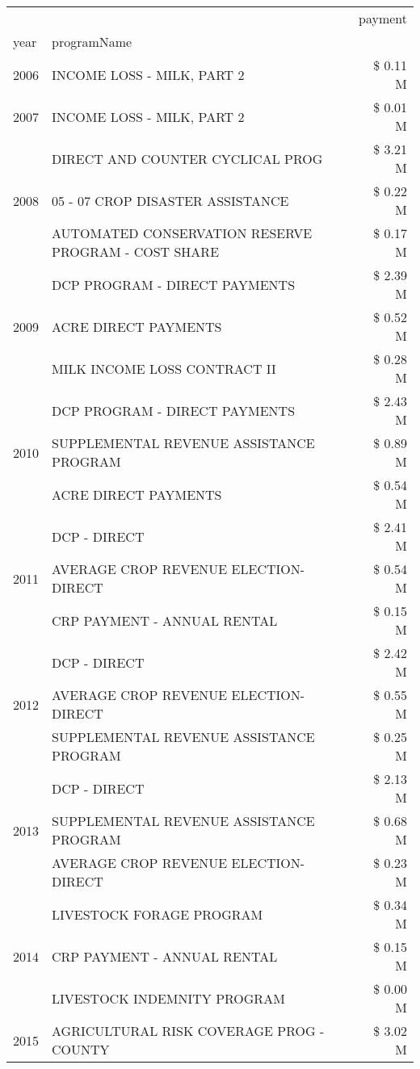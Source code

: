 \begin{tabular}{llr}
\toprule
 &  & payment \\
year & programName &  \\
\midrule
2006 & INCOME LOSS - MILK, PART 2 & \$ 0.11 M \\
\cline{1-3}
2007 & INCOME LOSS - MILK, PART 2 & \$ 0.01 M \\
\cline{1-3}
\multirow[t]{3}{*}{2008} & DIRECT AND COUNTER CYCLICAL PROG & \$ 3.21 M \\
 & 05 - 07 CROP DISASTER ASSISTANCE & \$ 0.22 M \\
 & AUTOMATED CONSERVATION RESERVE PROGRAM - COST SHARE & \$ 0.17 M \\
\cline{1-3}
\multirow[t]{3}{*}{2009} & DCP PROGRAM - DIRECT PAYMENTS & \$ 2.39 M \\
 & ACRE DIRECT PAYMENTS & \$ 0.52 M \\
 & MILK INCOME LOSS CONTRACT II & \$ 0.28 M \\
\cline{1-3}
\multirow[t]{3}{*}{2010} & DCP PROGRAM - DIRECT PAYMENTS & \$ 2.43 M \\
 & SUPPLEMENTAL REVENUE ASSISTANCE PROGRAM & \$ 0.89 M \\
 & ACRE DIRECT PAYMENTS & \$ 0.54 M \\
\cline{1-3}
\multirow[t]{3}{*}{2011} & DCP - DIRECT & \$ 2.41 M \\
 & AVERAGE CROP REVENUE ELECTION-DIRECT & \$ 0.54 M \\
 & CRP PAYMENT - ANNUAL RENTAL & \$ 0.15 M \\
\cline{1-3}
\multirow[t]{3}{*}{2012} & DCP - DIRECT & \$ 2.42 M \\
 & AVERAGE CROP REVENUE ELECTION-DIRECT & \$ 0.55 M \\
 & SUPPLEMENTAL REVENUE ASSISTANCE PROGRAM & \$ 0.25 M \\
\cline{1-3}
\multirow[t]{3}{*}{2013} & DCP - DIRECT & \$ 2.13 M \\
 & SUPPLEMENTAL REVENUE ASSISTANCE PROGRAM & \$ 0.68 M \\
 & AVERAGE CROP REVENUE ELECTION-DIRECT & \$ 0.23 M \\
\cline{1-3}
\multirow[t]{3}{*}{2014} & LIVESTOCK FORAGE PROGRAM & \$ 0.34 M \\
 & CRP PAYMENT - ANNUAL RENTAL & \$ 0.15 M \\
 & LIVESTOCK INDEMNITY PROGRAM & \$ 0.00 M \\
\cline{1-3}
\multirow[t]{3}{*}{2015} & AGRICULTURAL RISK COVERAGE PROG - COUNTY & \$ 3.02 M \\

\end{tabular}
